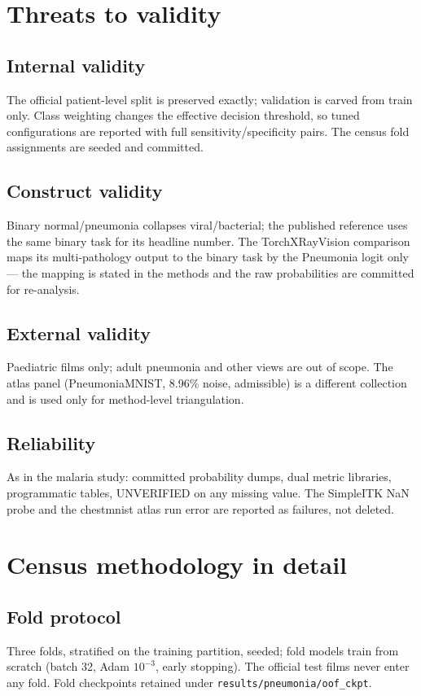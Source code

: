 
\section{Threats to validity}
\subsection{Internal validity}
The official patient-level split is preserved exactly; validation is
carved from train only. Class weighting changes the effective decision
threshold, so tuned configurations are reported with full
sensitivity/specificity pairs. The census fold assignments are seeded and
committed.
\subsection{Construct validity}
Binary normal/pneumonia collapses viral/bacterial; the published reference
uses the same binary task for its headline number. The TorchXRayVision
comparison maps its multi-pathology output to the binary task by the
Pneumonia logit only --- the mapping is stated in the methods and the raw
probabilities are committed for re-analysis.
\subsection{External validity}
Paediatric films only; adult pneumonia and other views are out of scope.
The atlas panel (PneumoniaMNIST, 8.96\% noise, admissible) is a different
collection and is used only for method-level triangulation.
\subsection{Reliability}
As in the malaria study: committed probability dumps, dual metric
libraries, programmatic tables, UNVERIFIED on any missing value. The
SimpleITK NaN probe and the chestmnist atlas run error are reported as
failures, not deleted.

\section{Census methodology in detail}
\subsection{Fold protocol}
Three folds, stratified on the training partition, seeded; fold models
train from scratch (batch 32, Adam $10^{-3}$, early stopping). The
official test films never enter any fold. Fold checkpoints retained under
\texttt{results/pneumonia/oof\_ckpt}.
